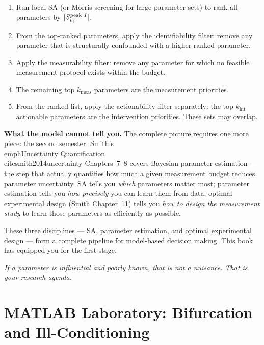 \begin{enumerate}[nosep]
\item Run local SA (or Morris screening for large parameter sets)
      to rank all parameters by $|S_{p_j}^{\text{peak}~I}|$.
\item From the top-ranked parameters, apply the identifiability filter:
      remove any parameter that is structurally confounded
      with a higher-ranked parameter.
\item Apply the measurability filter: remove any parameter for which
      no feasible measurement protocol exists within the budget.
\item The remaining top $k_{\text{meas}}$ parameters are the
      measurement priorities.
\item From the ranked list, apply the actionability filter separately:
      the top $k_{\text{int}}$ actionable parameters are the
      intervention priorities. These sets may overlap.
\end{enumerate}

\textbf{What the model cannot tell you.}
The complete picture requires one more piece: the second semester.
Smith's \\emph{Uncertainty Quantification}~\\cite{smith2014uncertainty}
Chapters~7--8 covers Bayesian parameter estimation --- the step
that actually quantifies how much a given measurement budget
reduces parameter uncertainty.
SA tells you \emph{which} parameters matter most; parameter estimation
tells you \emph{how precisely} you can learn them from data;
optimal experimental design (Smith Chapter~11) tells you
\emph{how to design the measurement study} to learn those parameters
as efficiently as possible.

These three disciplines --- SA, parameter estimation, and optimal
experimental design --- form a complete pipeline for model-based
decision making. This book has equipped you for the first stage.

\medskip\noindent
\textit{If a parameter is influential and poorly known,
that is not a nuisance. That is your research agenda.}

\section{MATLAB Laboratory: Bifurcation and Ill-Conditioning}
\label{sec:ch8matlab}

